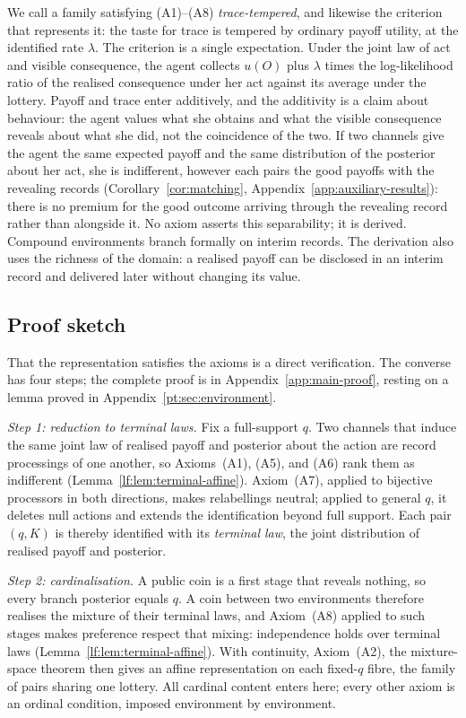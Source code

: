 \documentclass[11pt,a4paper]{article}
\theoremstyle{definition}
\newcommand{\1}{\mathbf 1}
\begin{document}
We call a family satisfying \textup{(A1)--(A8)} \emph{trace-tempered}, and likewise the criterion that
represents it: the taste for trace is tempered by ordinary payoff utility, at the identified rate $\lambda$.  The criterion is
a single expectation.  Under the joint law of act and visible consequence, the agent collects
$u(O)$ plus $\lambda$ times the log-likelihood ratio of the realised consequence under her act against its
average under the lottery.  Payoff and trace enter additively, and the additivity is a claim about behaviour:
the agent values what she obtains and what the visible consequence reveals about what she did, not the
coincidence of the two.  If two channels give the agent the same expected payoff and the same distribution of
the posterior about her act, she is indifferent, however each pairs the good payoffs with the revealing records
(Corollary~\ref{cor:matching}, Appendix~\ref{app:auxiliary-results}): there is no premium for the good outcome
arriving through the revealing record rather than alongside it.  No axiom asserts this separability; it is
derived.  Compound environments branch formally on interim records.  The derivation also uses the richness of
the domain: a realised payoff can be disclosed in an interim record and delivered later without changing its
value.

\subsection{Proof sketch}
That the representation satisfies the axioms is a direct verification.  The converse has four steps; the
complete proof is in Appendix~\ref{app:main-proof}, resting on a lemma proved in
Appendix~\ref{pt:sec:environment}.

\emph{Step 1: reduction to terminal laws.}  Fix a full-support $q$.  Two channels that induce the same joint law
of realised payoff and posterior about the action are record processings of one another, so Axioms~\textup{(A1)},
\textup{(A5)}, and \textup{(A6)} rank them as indifferent (Lemma~\ref{lf:lem:terminal-affine}).
Axiom~\textup{(A7)}, applied to bijective processors in both directions, makes relabellings neutral; applied to
general $q$, it deletes null actions and extends the identification beyond full support.  Each pair $(q,K)$ is
thereby identified with its \emph{terminal law}, the joint distribution of realised payoff and posterior.

\emph{Step 2: cardinalisation.}  A public coin is a first stage that reveals nothing, so every branch posterior
equals $q$.  A coin between two environments therefore realises the mixture of their terminal laws, and
Axiom~\textup{(A8)} applied to such stages makes preference respect that mixing: independence holds over
terminal laws (Lemma~\ref{lf:lem:terminal-affine}).  With continuity, Axiom~\textup{(A2)}, the mixture-space
theorem then gives an affine representation on each fixed-$q$ fibre, the family of pairs sharing one lottery.
All cardinal content enters here; every other axiom is an ordinal condition, imposed environment by environment.
\end{document}
